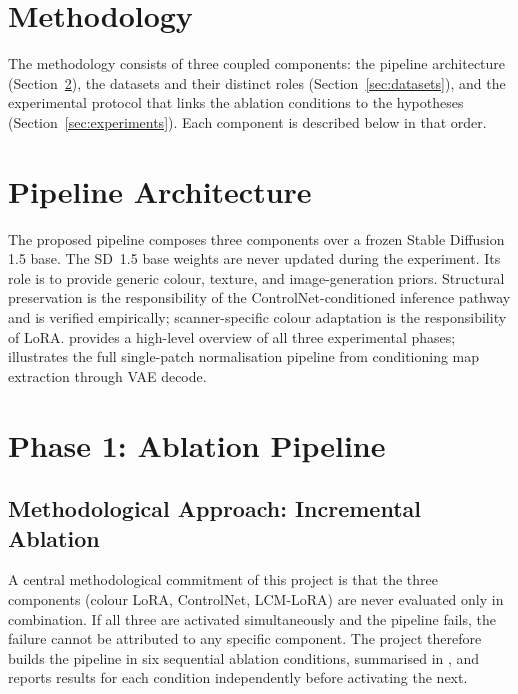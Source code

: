 \documentclass[a4paper,twoside,12pt]{report}
\begin{document}
\section{Methodology}
\label{sec:methodology}

The methodology consists of three coupled components: the pipeline architecture (Section~\ref{sec:pipeline_arch}), the datasets and their distinct roles (Section~\ref{sec:datasets}), and the experimental protocol that links the ablation conditions to the hypotheses (Section~\ref{sec:experiments}). Each component is described below in that order.

\section{Pipeline Architecture}
\label{sec:pipeline_arch}

The proposed pipeline composes three components over a frozen Stable Diffusion 1.5 base. The SD~1.5 base weights are never updated during the experiment. Its role is to provide generic colour, texture, and image-generation priors. Structural preservation is the responsibility of the ControlNet-conditioned inference pathway and is verified empirically; scanner-specific colour adaptation is the responsibility of LoRA.  provides a high-level overview of all three experimental phases;  illustrates the full single-patch normalisation pipeline from conditioning map extraction through VAE decode.
\section{Phase 1: Ablation Pipeline}
\label{sec:phase1_sec}
\subsection{Methodological Approach: Incremental Ablation}
\label{sec:ablation_methodology}

A central methodological commitment of this project is that the three components (colour LoRA, ControlNet, LCM-LoRA) are never evaluated only in combination. If all three are activated simultaneously and the pipeline fails, the failure cannot be attributed to any specific component. The project therefore builds the pipeline in six sequential ablation conditions, summarised in , and reports results for each condition independently before activating the next.
\end{document}
